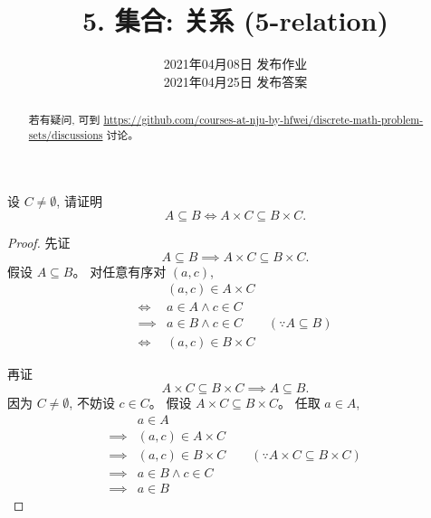 \documentclass[a4paper, justified]{tufte-handout}
\title{5. 集合: 关系 (5-relation)}
\date{2021年04月08日 发布作业 \\ 2021年04月25日 发布答案}
\begin{document}
\maketitle
\noplagiarism %
\begin{abstract}
  若有疑问, 可到 \url{https://github.com/courses-at-nju-by-hfwei/discrete-math-problem-sets/discussions}
  讨论。
\end{abstract}
\beginrequired

\begin{problem}
  设 $C \neq \emptyset$, 请证明
  \[
    A \subseteq B \iff A \times C \subseteq B \times C.
  \]
\end{problem}

\begin{proof}
  先证
  \[
    A \subseteq B \implies A \times C \subseteq B \times C.
  \]
  假设 $A \subseteq B$。
  对任意有序对 $(a, c)$,
  \begin{align}
    & (a, c) \in A \times C \\[6pt]
    \iff & a \in A \land c \in C \\[6pt]
    \implies & a \in B \land c \in C \qquad (\because A \subseteq B)\\[6pt]
    \iff & (a, c) \in B \times C
  \end{align}

  再证
  \[
    A \times C \subseteq B \times C \implies A \subseteq B.
  \]
  因为 $C \neq \emptyset$, 不妨设 $c \in C$。
  假设 $A \times C \subseteq B \times C$。
  任取 $a \in A$,
  \setcounter{equation}{0}
  \begin{align}
    & a \in A \\[6pt]
    \implies &(a, c) \in A \times C \\[6pt]
    \implies &(a, c) \in B \times C
      \qquad (\because A \times C \subseteq B \times C) \\[6pt]
    \implies & a \in B \land c \in C \\[6pt]
    \implies &a \in B
  \end{align}
\end{proof}
\end{document}
